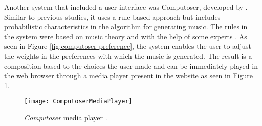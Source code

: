 Another system that included a user interface was Computoser, developed by \citet{bozhanov2014computoser}. Similar to previous studies, it uses a rule-based approach but includes probabilistic characteristics in the algorithm for generating music. The rules in the system were based on music theory and with the help of some experts \citep{bozhanov2014computoser}. As seen in Figure \ref{fig:computoser-preference}, the system enables the user to adjust the weights in the preferences with which the music is generated. The result is a composition based to the choices the user made and can be immediately played in the web browser through a media player present in the website as seen in Figure \ref{fig:computoser-media}. 

\begin{figure}[H]
	\centering
	\texttt{[image: ComputoserMediaPlayer]}
    \caption{\textit{Computoser} media player \citep{bozhanov2014computoser}.}
    \label{fig:computoser-media}
\end{figure}

\begin{comment}
Another way to improve upon the process of musical composition is through focusing on what feels natural to the target users. Composers and musicians also feel with their body when composing music through instruments \citep{de2012playing}. In recent years, the use of touch interfaces have proven to feel more natural than using external input devices like the mouse \citep{travis2014comparative}. The use of gesture interactions through modern innovations like the touch screen is both an intuitive and interaction focused approach for a system \citep{epps2006a}. It is also mentioned in the study of \cite{travis2014comparative} that despite the general acceptance of the public with the innovation of touch, there are still facets of the technology that can be improved upon for the overall performance and usability of the touch screen \citep{travis2014comparative}.
\end{comment}


